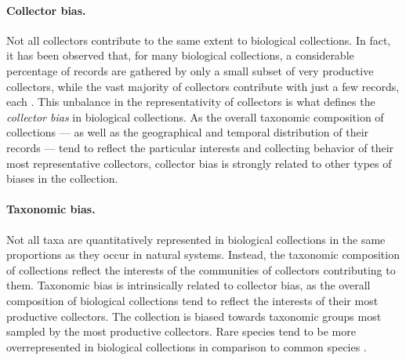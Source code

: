 \paragraph*{Collector bias.}
Not all collectors contribute to the same extent to biological collections.
In fact, it has been observed that, for many biological collections, a considerable percentage of records are gathered by only a small subset of very productive collectors, while the vast majority of collectors contribute with just a few records, each \cite{Daru2017,Carine2012}.
This unbalance in the representativity of collectors is what defines the \textit{collector bias} in biological collections.
As the overall taxonomic composition of collections --- as well as the geographical and temporal distribution of their records --- tend to reflect the particular interests and collecting behavior of their most representative collectors, collector bias is strongly related to other types of biases in the collection.

\paragraph*{Taxonomic bias.}
Not all taxa are quantitatively represented in biological collections in the same proportions as they occur in natural systems.
Instead, the taxonomic composition of collections reflect the interests of the communities of collectors contributing to them.
Taxonomic bias is intrinsically related to collector bias, as the overall composition of biological collections tend to reflect the interests of their most productive collectors.
The collection is biased towards taxonomic groups most sampled by the most productive collectors.
%
Rare species tend to be more overrepresented in biological collections in comparison to common species \cite{}.
%

